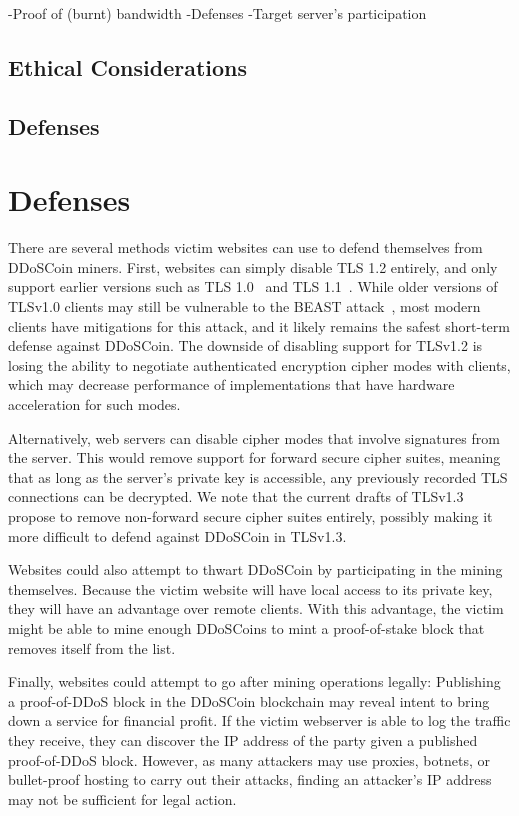 -Proof of (burnt) bandwidth
-Defenses
-Target server's participation

\subsection{Ethical Considerations}
\shrug


\subsection{Defenses}
\fi
\section{Defenses}

There are several methods victim websites can use to defend themselves from
DDoSCoin miners. First, websites can simply disable TLS 1.2 entirely, and only
support earlier versions such as TLS 1.0~\cite{rfc2246} and TLS
1.1~\cite{rfc4346}. While older versions of
TLSv1.0 clients may still be vulnerable to the BEAST attack~\cite{beast}, most
modern clients have mitigations for this attack, and it likely remains the
safest short-term defense against DDoSCoin. The downside of disabling support
for TLSv1.2 is losing the ability to negotiate authenticated encryption cipher
modes with clients, which may decrease performance of implementations that have
hardware acceleration for such modes.

Alternatively, web servers can disable cipher modes that involve signatures from
the server. This would remove support for forward secure cipher suites, meaning
that as long as the server's private key is accessible, any previously recorded
TLS connections can be decrypted. We note that the current drafts of TLSv1.3
propose to remove non-forward secure cipher suites entirely, possibly making it
more difficult to defend against DDoSCoin in TLSv1.3.

Websites could also attempt to thwart DDoSCoin by participating in the mining
themselves. Because the victim website will have local access to its private
key, they will have an advantage over remote clients. With this advantage, the
victim might be able to mine enough DDoSCoins to mint a proof-of-stake block
that removes itself from the list.

Finally, websites could attempt to go after mining operations legally:
Publishing a proof-of-DDoS block in the DDoSCoin blockchain may reveal intent to
bring down a service for financial profit. If the victim webserver is able to
log the traffic they receive, they can discover the IP address of the party
given a published proof-of-DDoS block. However, as many attackers may use proxies,
botnets, or bullet-proof hosting to carry out their attacks, finding an
attacker's IP address may not be sufficient for legal action.


